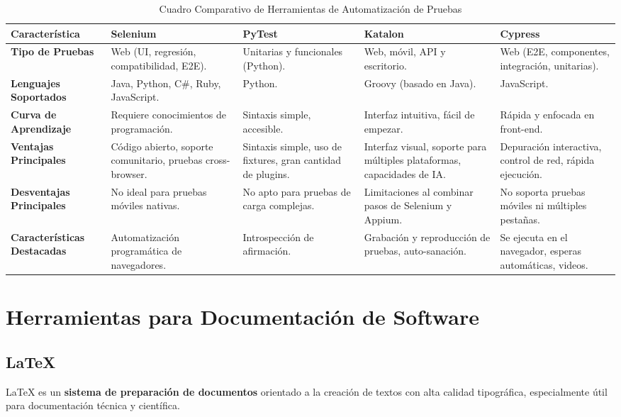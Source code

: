 \documentclass[man, floatsintext]{apa7}
\begin{document}
	\begin{table}[h!]
		\centering
		\small %
		\begin{tabular}{|p{3cm}|p{3cm}|p{3cm}|p{3cm}|p{3cm}|}
			\hline
			\textbf{Característica} & \textbf{Selenium} & \textbf{PyTest} & \textbf{Katalon} & \textbf{Cypress} \\
			\hline
			\textbf{Tipo de Pruebas} & Web (UI, regresión, compatibilidad, E2E). & Unitarias y funcionales (Python). & Web, móvil, API y escritorio. & Web (E2E, componentes, integración, unitarias). \\
			\hline
			\textbf{Lenguajes Soportados} & Java, Python, C\#, Ruby, JavaScript. & Python. & Groovy (basado en Java). & JavaScript. \\
			\hline
			\textbf{Curva de Aprendizaje} & Requiere conocimientos de programación. & Sintaxis simple, accesible. & Interfaz intuitiva, fácil de empezar. & Rápida y enfocada en front-end. \\
			\hline
			\textbf{Ventajas Principales} & Código abierto, soporte comunitario, pruebas cross-browser. & Sintaxis simple, uso de fixtures, gran cantidad de plugins. & Interfaz visual, soporte para múltiples plataformas, capacidades de IA. & Depuración interactiva, control de red, rápida ejecución. \\
			\hline
			\textbf{Desventajas Principales} & No ideal para pruebas móviles nativas. & No apto para pruebas de carga complejas. & Limitaciones al combinar pasos de Selenium y Appium. & No soporta pruebas móviles ni múltiples pestañas. \\
			\hline
			\textbf{Características Destacadas} & Automatización programática de navegadores. & Introspección de afirmación. & Grabación y reproducción de pruebas, auto-sanación. & Se ejecuta en el navegador, esperas automáticas, videos. \\
			\hline
		\end{tabular}
		\caption{Cuadro Comparativo de Herramientas de Automatización de Pruebas}
		\label{tab:comparativo_herramientas}
	\end{table}
	\FloatBarrier
	
	\newpage
	\section{Herramientas para Documentación de Software}
	\subsection{LaTeX}
	LaTeX es un \textbf{sistema de preparación de documentos} orientado a la creación de textos con alta calidad tipográfica, especialmente útil para documentación técnica y científica.
\end{document}
